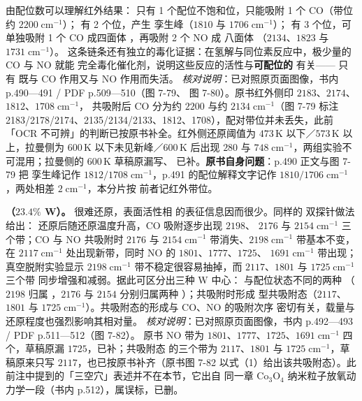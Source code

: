 由配位数可以理解红外结果： 只有 1 个配位不饱和位，只能吸附
1 个 CO（带位约 $2200\;\mathrm{cm^{-1}}$）； 有 2 个位，产生
 孪生峰（$1810$ 与 $1706\;\mathrm{cm^{-1}}$）； 有
3 个位，可单独吸附 1 个 CO 成四面体 ，再吸附 2 个 NO 成
八面体 （$2134$、$1823$ 与 $1731\;\mathrm{cm^{-1}}$）。
这条链条还有独立的毒化证据：在氢解与同位素反应中，极少量的 CO 与 NO 就能
完全毒化催化剂，说明这些反应的活性与\textbf{可配位的 } 有关——
只有  既与 CO 作用又与 NO 作用而失活。
\emph{核对说明}：已对照原页面图像，书内 p.490—491 / PDF p.509—510（图 7-79、
图 7-80）。原书红外侧印 $2183$、$2174$、$1812$、$1708\;\mathrm{cm^{-1}}$，
共吸附后 CO 分为约 $2200$ 与约 $2134\;\mathrm{cm^{-1}}$（图 7-79 标注
2183/2178/2174、2135/2134/2133、1812、1708），配对带位并未丢失，此前
「OCR 不可辨」的判断已按原书补全。红外侧还原阈值为 $473$\,K 以下／$573$\,K
以上，拉曼侧为 $600$\,K 以下未见新峰／$600$\,K 后出现 $280$ 与
$748\;\mathrm{cm^{-1}}$，两组实验不可混用；拉曼侧的 $600$\,K 草稿原漏写、
已补。\textbf{原书自身问题}：p.490 正文与图 7-79 把  孪生峰记作
$1812/1708\;\mathrm{cm^{-1}}$，p.491 的配位解释文字记作
$1810/1706\;\mathrm{cm^{-1}}$，两处相差 $2\;\mathrm{cm^{-1}}$，本分片按
前者记红外带位。

\textbf{（$23.4\%$ W）。} 很难还原，表面活性相
的表征信息因而很少。同样的
双探针做法给出： 还原后随还原温度升高，CO 吸附逐步出现 $2198$、
$2176$ 与 $2154\;\mathrm{cm^{-1}}$ 三个带；CO 与 NO 共吸附时 $2176$ 与
$2154\;\mathrm{cm^{-1}}$ 带消失、$2198\;\mathrm{cm^{-1}}$ 带基本不变，
在 $2117\;\mathrm{cm^{-1}}$ 处出现新带，同时 NO 的 $1801$、$1777$、$1725$、
$1691\;\mathrm{cm^{-1}}$ 带出现；真空脱附实验显示 $2198\;\mathrm{cm^{-1}}$
带不稳定很容易抽掉，而 $2117$、$1801$ 与 $1725\;\mathrm{cm^{-1}}$ 三个带
同步增强和减弱。据此可区分出三种 W 中心： 与配位状态不同的两种
（$2198$ 归属 ，$2176$ 与 $2154$ 分别归属两种
）；共吸附时形成  型共吸附态（$2117$、
$1801$ 与 $1725\;\mathrm{cm^{-1}}$）。共吸附态的形成与 CO、NO 的吸附次序
密切有关，载量与还原程度也强烈影响其相对量。
\emph{核对说明}：已对照原页面图像，书内 p.492—493 / PDF p.511—512（图 7-82）。
原书 NO 带为 $1801$、$1777$、$1725$、$1691\;\mathrm{cm^{-1}}$ 四个，草稿原漏
$1725$，已补；共吸附态  的三个带为 $2117$、$1801$ 与
$1725\;\mathrm{cm^{-1}}$，草稿原来只写 $2117$，也已按原书补齐（原书图 7-82
以式（1）给出该共吸附态）。此前注中提到的「三空穴」表述并不在本节，它出自
同一章 Co$_3$O$_4$ 纳米粒子放氧动力学一段（书内 p.512），属误标，已删。

